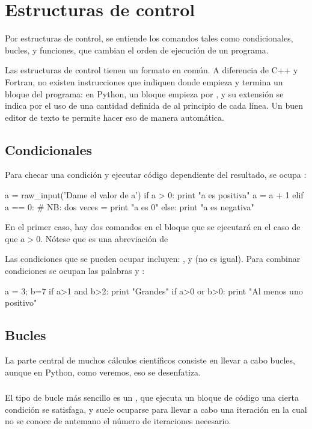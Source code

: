 \chapter{Estructuras de control}

Por estructuras de control, se entiende los comandos tales como condicionales, bucles, y funciones, que cambian el orden de ejecución de un programa.  

Las estructuras de control tienen un formato en común. A diferencia de C++ y Fortran, no existen instrucciones que indiquen donde empieza y termina un bloque del programa: en Python, un bloque empieza por \inl{:}, y su extensión se indica por el uso de una cantidad definida de  al principio de cada línea. Un buen editor de texto te permite hacer eso de manera automática.

\section{Condicionales}
Para checar una condición y ejecutar código dependiente del resultado, se ocupa :
\begin{python}
a = raw_input('Dame el valor de a')
if a > 0:
  print "a es positiva"
  a = a + 1
elif a == 0:		# NB: dos veces =
  print "a es 0"
else:
  print "a es negativa"
\end{python}
En el primer caso, hay dos comandos en el bloque que se ejecutará en el caso de que $a > 0$.
Nótese que  es una abreviación de 

Las condiciones que se pueden ocupar incluyen: \inl{<}, \inl{<=} y \inl {!=} (no es igual).
Para combinar condiciones se ocupan las palabras  y :
\begin{python}
a = 3; b=7
if a>1 and b>2:
  print "Grandes"
if a>0 or b>0:
  print "Al menos uno positivo"
\end{python}


\section{Bucles}
La parte central de muchos cálculos científicos consiste en llevar a cabo bucles, aunque en Python, como veremos, eso se desenfatiza.

\subsection{}
El tipo de bucle más sencillo es un , que ejecuta un bloque de código  una cierta condición se satisfaga, y suele ocuparse para llevar a cabo una iteración en la cual no se conoce de antemano el número de iteraciones necesario. 

